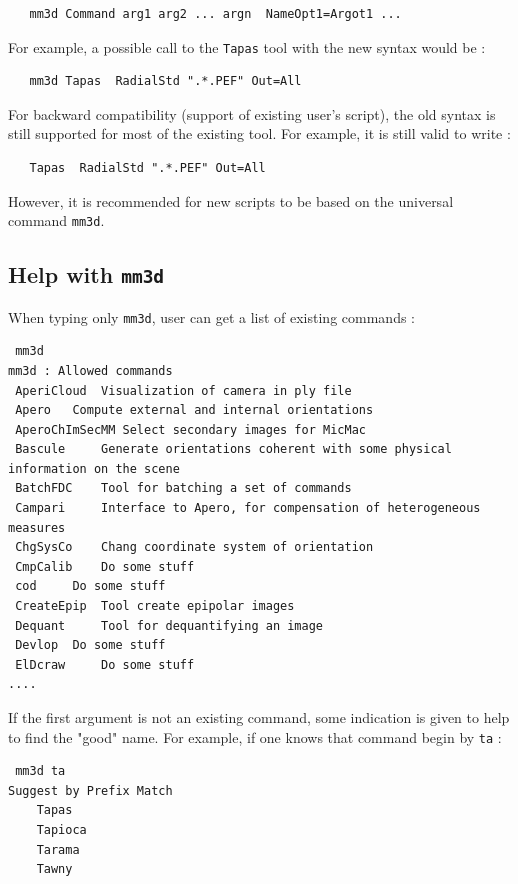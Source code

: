 \begin{verbatim}
   mm3d Command arg1 arg2 ... argn  NameOpt1=Argot1 ...
\end{verbatim}

For example, a possible call to the {\tt Tapas} tool with the new syntax would be :

\begin{verbatim}
   mm3d Tapas  RadialStd ".*.PEF" Out=All
\end{verbatim}


For backward compatibility (support of existing user's script), the old syntax is still supported
for most of the existing tool. For example, it is still valid to write :

\begin{verbatim}
   Tapas  RadialStd ".*.PEF" Out=All
\end{verbatim}

However, it is recommended for new scripts to be based on the universal command {\tt mm3d}.



\subsection{Help with {\tt mm3d}}

When typing only {\tt mm3d}, user can get a list of existing commands :


\begin{verbatim}
 mm3d
mm3d : Allowed commands 
 AperiCloud	 Visualization of camera in ply file
 Apero	 Compute external and internal orientations
 AperoChImSecMM	Select secondary images for MicMac 
 Bascule	 Generate orientations coherent with some physical information on the scene
 BatchFDC	 Tool for batching a set of commands
 Campari	 Interface to Apero, for compensation of heterogeneous measures
 ChgSysCo	 Chang coordinate system of orientation
 CmpCalib	 Do some stuff
 cod	 Do some stuff
 CreateEpip	 Tool create epipolar images
 Dequant	 Tool for dequantifying an image
 Devlop	 Do some stuff
 ElDcraw	 Do some stuff
....
\end{verbatim}

If the first argument is not an existing command, some indication is given to help to find 
the "good" name. For example, if one knows that command begin by {\tt ta}  :

\begin{verbatim}
 mm3d ta
Suggest by Prefix Match
    Tapas
    Tapioca
    Tarama
    Tawny
\end{verbatim}

